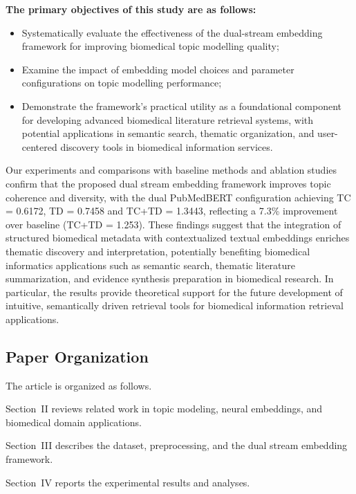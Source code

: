 \documentclass{ieeeaccess}
\begin{document}
\noindent\textbf{The primary objectives of this study are as follows:}
\begin{itemize}
\item Systematically evaluate the effectiveness of the dual-stream embedding framework for improving biomedical topic modelling quality;
\item Examine the impact of embedding model choices and parameter configurations on topic modelling performance;
\item Demonstrate the framework’s practical utility as a foundational component for developing advanced biomedical literature retrieval systems, with potential applications in semantic search, thematic organization, and user-centered discovery tools in biomedical information services.
\end{itemize}
Our experiments and comparisons with baseline methods and ablation studies confirm that the proposed dual stream embedding framework improves topic coherence and diversity, with the dual PubMedBERT configuration achieving TC = 0.6172, TD = 0.7458 and TC+TD = 1.3443, reflecting a 7.3\% improvement over baseline (TC+TD = 1.253). These findings suggest that the integration of structured biomedical metadata with contextualized textual embeddings enriches thematic discovery and interpretation, potentially benefiting biomedical informatics applications such as semantic search, thematic literature summarization, and evidence synthesis preparation in biomedical research. In particular, the results provide theoretical support for the future development of intuitive, semantically driven retrieval tools for biomedical information retrieval applications.


\subsection{Paper Organization}

The article is organized as follows. 

Section~II reviews related work in topic modeling, neural embeddings, and biomedical domain applications.

Section~III describes the dataset, preprocessing, and the dual stream embedding framework.  

Section~IV reports the experimental results and analyses.  
\end{document}
